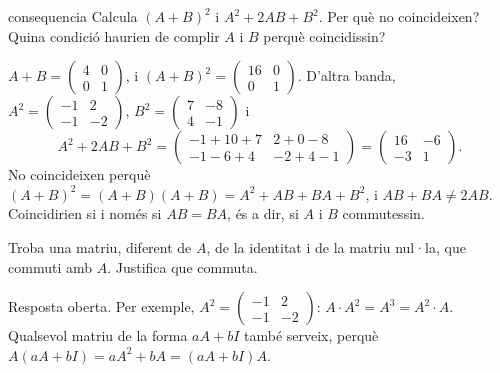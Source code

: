 \begin{apartats}
\begin{tria}{consequencia}
Calcula $(A+B)^2$ i $A^2+2AB+B^2$. Per què no coincideixen? Quina condició haurien de complir $A$ i
$B$ perquè coincidissin?

\begin{solucio}
$A+B=\begin{pmatrix}4&0\\0&1\end{pmatrix}$, i $(A+B)^2=\begin{pmatrix}16&0\\0&1\end{pmatrix}$. D'altra
banda, $A^2=\begin{pmatrix}-1&2\\-1&-2\end{pmatrix}$, $B^2=\begin{pmatrix}7&-8\\4&-1\end{pmatrix}$ i
\[
A^2+2AB+B^2=\begin{pmatrix}-1+10+7&2+0-8\\-1-6+4&-2+4-1\end{pmatrix}=\begin{pmatrix}16&-6\\-3&1\end{pmatrix}.
\]
No coincideixen perquè $(A+B)^2=(A+B)(A+B)=A^2+AB+BA+B^2$, i $AB+BA\ne2AB$. Coincidirien si i només si
$AB=BA$, és a dir, si $A$ i $B$ commutessin.
\end{solucio}
\end{tria}

\begin{nomesllarg}
Troba una matriu, diferent de $A$, de la identitat i de la matriu nul·la, que commuti amb $A$. Justifica
que commuta.

\begin{solucio}
Resposta oberta. Per exemple, $A^2=\begin{pmatrix}-1&2\\-1&-2\end{pmatrix}$: $A\cdot A^2=A^3=A^2\cdot A$.
Qualsevol matriu de la forma $aA+bI$ també serveix, perquè $A(aA+bI)=aA^2+bA=(aA+bI)A$.
\end{solucio}
\end{nomesllarg}

\end{apartats}
